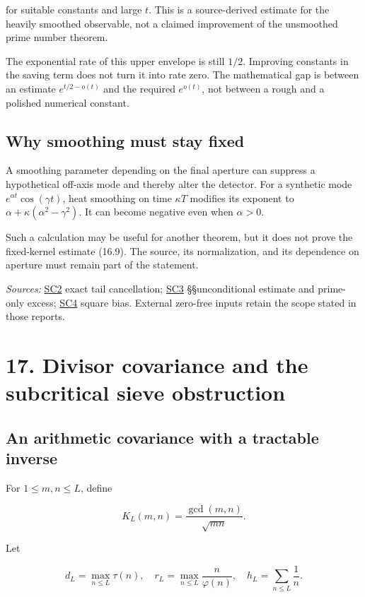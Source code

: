 \documentclass[
  10pt,
  a4paper,
  10pt,
  oneside,
  openany]{book}
\begin{document}
for suitable constants and large \(t\). This is a source-derived
estimate for the heavily smoothed observable, not a claimed improvement
of the unsmoothed prime number theorem.

The exponential rate of this upper envelope is still \(1/2\). Improving
constants in the saving term does not turn it into rate zero. The
mathematical gap is between an estimate \(e^{t/2-o(t)}\) and the
required \(e^{o(t)}\), not between a rough and a polished numerical
constant.

\subsection{Why smoothing must stay
fixed}\label{why-smoothing-must-stay-fixed}

A smoothing parameter depending on the final aperture can suppress a
hypothetical off-axis mode and thereby alter the detector. For a
synthetic mode \(e^{\alpha t}\cos(\gamma t)\), heat smoothing on time
\(\kappa T\) modifies its exponent to
\(\alpha+\kappa(\alpha^2-\gamma^2)\). It can become negative even when
\(\alpha>0\).

Such a calculation may be useful for another theorem, but it does not
prove the fixed-kernel estimate (16.9). The source, its normalization,
and its dependence on aperture must remain part of the statement.

\emph{Sources:} \hyperref[source-sc2]{SC2} exact tail cancellation;
\hyperref[source-sc3]{SC3} §§unconditional estimate and prime-only
excess; \hyperref[source-sc4]{SC4} square bias. External zero-free
inputs retain the scope stated in those reports.

\section{17. Divisor covariance and the subcritical sieve
obstruction}\label{ch-gcd}

\subsection{An arithmetic covariance with a tractable
inverse}\label{an-arithmetic-covariance-with-a-tractable-inverse}

For \(1\le m,n\le L\), define

\[
K_L(m,n)=\frac{\gcd(m,n)}{\sqrt{mn}}.
\tag{17.1}\label{eq:17.1}
\]

Let

\[
d_L=\max_{n\le L}\tau(n),
\quad r_L=\max_{n\le L}\frac n{\varphi(n)},
\quad h_L=\sum_{n\le L}\frac1n.
\tag{17.2}\label{eq:17.2}
\]
\end{document}
